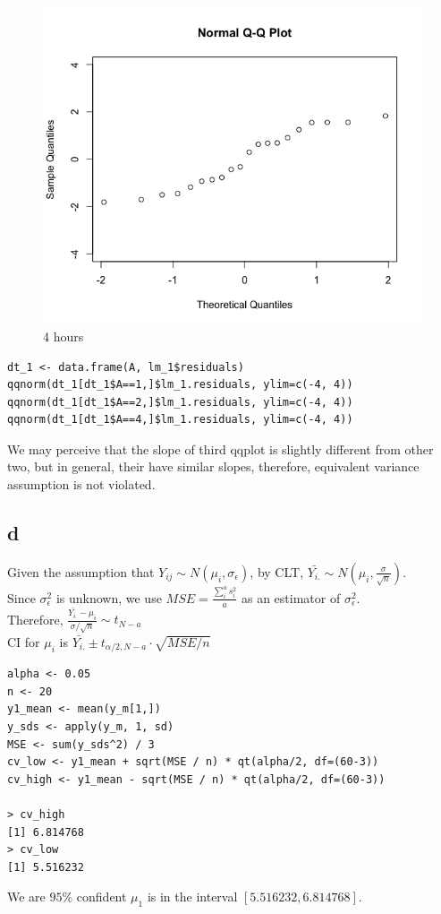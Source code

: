 \documentclass[11pt,letterpaper]{article}
\begin{document}
\begin{figure}[!htb]
  \includegraphics[width=\linewidth]{lect-7-4-c-3.png}
  \caption{4 hours}
\endminipage
\end{figure}
\noindent 

\begin{verbatim}
dt_1 <- data.frame(A, lm_1$residuals)
qqnorm(dt_1[dt_1$A==1,]$lm_1.residuals, ylim=c(-4, 4))
qqnorm(dt_1[dt_1$A==2,]$lm_1.residuals, ylim=c(-4, 4))
qqnorm(dt_1[dt_1$A==4,]$lm_1.residuals, ylim=c(-4, 4))
\end{verbatim}

\noindent We may perceive that the slope of third qqplot is slightly different from other two, but in general, their have similar slopes, therefore, equivalent variance assumption is not violated.

\subsection*{d}
\noindent Given the assumption that $Y_{ij} \sim N(\mu_i, \sigma_{\epsilon})$, by CLT, $\bar{Y_{i.}} \sim N(\mu_i, \frac{\sigma}{\sqrt{n}})$. \\
\noindent Since $\sigma_{\epsilon}^2$ is unknown, we use $MSE = \frac{\sum_i^a s_i^2}{a}$ as an estimator of $\sigma_{\epsilon}^2$. \\
\noindent Therefore, $\frac{\bar{Y_{i.}} - \mu_i}{\sigma / \sqrt{n}} \sim t_{N-a}$\\
\noindent CI for $\mu_i$ is $\bar{Y_{i.}} \pm t_{\alpha / 2, N-a} \cdot \sqrt{MSE / n}$
\begin{verbatim}
alpha <- 0.05
n <- 20
y1_mean <- mean(y_m[1,])
y_sds <- apply(y_m, 1, sd)
MSE <- sum(y_sds^2) / 3
cv_low <- y1_mean + sqrt(MSE / n) * qt(alpha/2, df=(60-3))
cv_high <- y1_mean - sqrt(MSE / n) * qt(alpha/2, df=(60-3))

> cv_high
[1] 6.814768
> cv_low
[1] 5.516232
\end{verbatim}
We are $95 \%$ confident $\mu_1$ is in the interval $[5.516232, 6.814768]$.
\end{document}
